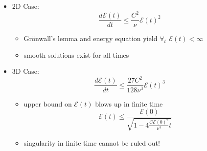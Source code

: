 \documentclass{beamer}
\def\E{{\mathcal{E}}}
\begin{document}
\frame
{

\begin{itemize}
\item<1->
2D Case:
\begin{equation*}
\frac{d\E(t)}{dt} \le \frac{C^2}{\nu} \E(t)^2
\end{equation*}
\begin{itemize}
\item<2->
Gr\"onwall's lemma and energy equation yield $\forall_t$ $\E(t) < \infty$
\smallskip
\item<3->
smooth solutions exist for all times
\end{itemize}

\bigskip
\item<4->
3D Case:
\begin{equation*}
\frac{d\E(t)}{dt} \le \frac{27 C^2}{128 \nu^3} \E(t)^3
\end{equation*}
\begin{itemize}
\item<5->
upper bound on $\E(t)$ blows up in finite time
\begin{equation*}
\E(t) \le \frac{\E(0)}{\sqrt{1 - 4 \frac{C \E(0)^2}{\nu^3} t}}
\end{equation*}
\item<6->
singularity in finite time cannot be ruled out!
\end{itemize}

\end{itemize}
}

\end{document}
